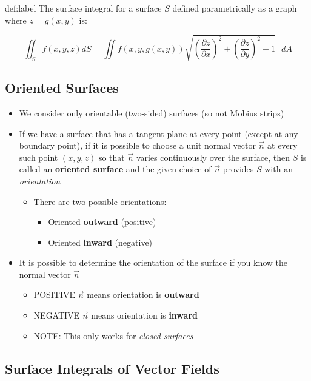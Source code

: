\documentclass{package/notes}
\begin{document}
\begin{definition}{def:label}
	The surface integral for a surface $S$ defined parametrically as a graph where $z=g(x,y)$ is:

	$$\iint_S f(x,y,z)dS = \iint f(x,y,g(x,y))\sqrt{\left(\frac{\partial{z}}{\partial{x}}\right)^2+\left(\frac{\partial{z}}{\partial{y}}\right)^2+1}\text{ }dA$$
\end{definition}


\subsection{Oriented Surfaces}

\begin{itemize}
	\item We consider only orientable (two-sided) surfaces (so not Mobius strips)
	\item If we have a surface that has a tangent plane at every point (except at any boundary point), if it is possible to choose a unit normal vector $\vec{n}$ at every such point $(x,y,z)$ so that $\vec{n}$ varies continuously over the surface, then $S$ is called an \textbf{oriented surface} and the given choice of $\vec{n}$ provides $S$ with an \textit{orientation}
	\begin{itemize}
		\item There are two possible orientations:
		\begin{itemize}
			\item Oriented \textbf{outward} (positive)
			\item Oriented \textbf{inward} (negative)
		\end{itemize}
	\end{itemize}
	\item It is possible to determine the orientation of the surface if you know the normal vector $\vec{n}$ 
	\begin{itemize}
		\item POSITIVE $\vec{n}$ means orientation is \textbf{outward}
		\item NEGATIVE $\vec{n}$ means orientation is \textbf{inward}
		\item NOTE: This only works for \textit{closed surfaces}
	\end{itemize}
\end{itemize}


\subsection{Surface Integrals of Vector Fields}
\end{document}
